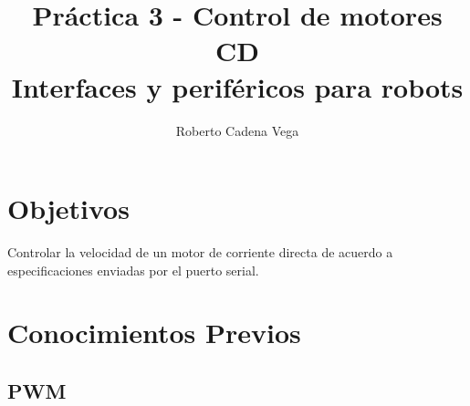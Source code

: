 



\title{Práctica 3 - Control de motores CD\\Interfaces y periféricos para robots}
\author{Roberto Cadena Vega} %
\date{}



\maketitle %


\section{Objetivos}

	Controlar la velocidad de un motor de corriente directa de acuerdo a especificaciones enviadas por el puerto serial.


\section{Conocimientos Previos}


	\subsection{PWM}

